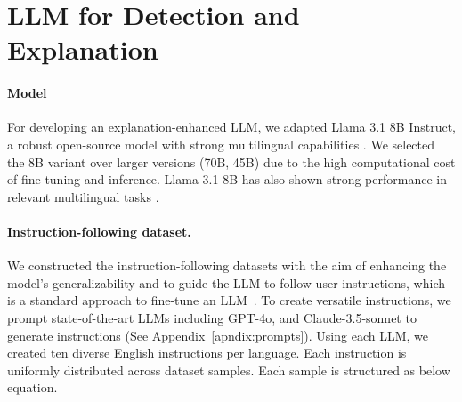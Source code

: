 \section{LLM for Detection and Explanation}
\label{sec:experiments}

\paragraph{Model}
For developing an explanation-enhanced LLM, we adapted Llama 3.1 8B Instruct, a robust open-source model with strong multilingual capabilities \cite{dubey2024llama}. We selected the 8B variant over larger versions (70B, 45B) due to the high computational cost of fine-tuning and inference. Llama-3.1 8B has also shown strong performance in relevant multilingual tasks \cite{pavlyshenko2023analysisdisinformationfakenews, kmainasi2024llamalensspecializedmultilingualllm}.

\noindent
\paragraph{Instruction-following dataset.}
We constructed the instruction-following datasets with the aim of enhancing the model's generalizability and to guide the LLM to follow user instructions, which is a standard approach to fine-tune an LLM~\cite{zhang2023instruction}. To create versatile instructions, we prompt state-of-the-art LLMs including GPT-4o, and Claude-3.5-sonnet to generate instructions (See Appendix~\ref{apndix:prompts}). Using each LLM, we created ten diverse English instructions per language. Each instruction is uniformly distributed across dataset samples. Each sample is structured as below equation.


